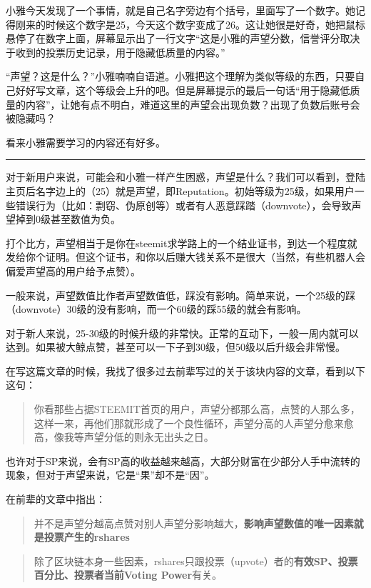 \documentclass[]{ctexbook}
\begin{document}
小雅今天发现了一个事情，就是自己名字旁边有个括号，里面写了一个数字。她记得刚来的时候这个数字是25，今天这个数字变成了26。这让她很是好奇，她把鼠标悬停了在数字上面，屏幕显示出了一行文字``这是小雅的声望分数，信誉评分取决于收到的投票历史记录，用于隐藏低质量的内容。''

``声望？这是什么？''小雅喃喃自语道。小雅把这个理解为类似等级的东西，只要自己好好写文章，这个等级会上升的吧。但是屏幕提示的最后一句话``用于隐藏低质量的内容''，让她有点不明白，难道这里的声望会出现负数？出现了负数后账号会被隐藏吗？

看来小雅需要学习的内容还有好多。

\begin{center}\rule{0.5\linewidth}{\linethickness}\end{center}

对于新用户来说，可能会和小雅一样产生困惑，声望是什么？我们可以看到，登陆主页后名字边上的（25）就是声望，即Reputation。初始等级为25级，如果用户一些错误行为（比如：剽窃、伪原创等）或者有人恶意踩踏（downvote），会导致声望掉到0级甚至数值为负。

打个比方，声望相当于是你在steemit求学路上的一个结业证书，到达一个程度就发给你个证明。但这个证书，和你以后赚大钱关系不是很大（当然，有些机器人会偏爱声望高的用户给予点赞）。

一般来说，声望数值比作者声望数值低，踩没有影响。简单来说，一个25级的踩（downvote）30级的没有影响，而一个60级的踩55级的就会有影响。

对于新人来说，25-30级的时候升级的非常快。正常的互动下，一般一周内就可以达到。如果被大鲸点赞，甚至可以一下子到30级，但50级以后升级会非常慢。

在写这篇文章的时候，我找了很多过去前辈写过的关于该块内容的文章，看到以下这句：

\begin{quote}
你看那些占据STEEMIT首页的用户，声望分都那么高，点赞的人那么多，这样一来，再他们那就形成了一个良性循环，声望分高的人声望分愈来愈高，像我等声望分低的则永无出头之日。
\end{quote}

也许对于SP来说，会有SP高的收益越来越高，大部分财富在少部分人手中流转的现象，但对于声望来说，它是``果''却不是``因''。

在前辈的文章中指出：

\begin{quote}
并不是声望分越高点赞对别人声望分影响越大，\textbf{影响声望数值的唯一因素就是投票产生的rshares}
\end{quote}

\begin{quote}
除了区块链本身一些因素，rshares只跟投票（upvote）者的\textbf{有效SP、投票百分比、投票者当前Voting Power}有关。
\end{quote}
\end{document}
